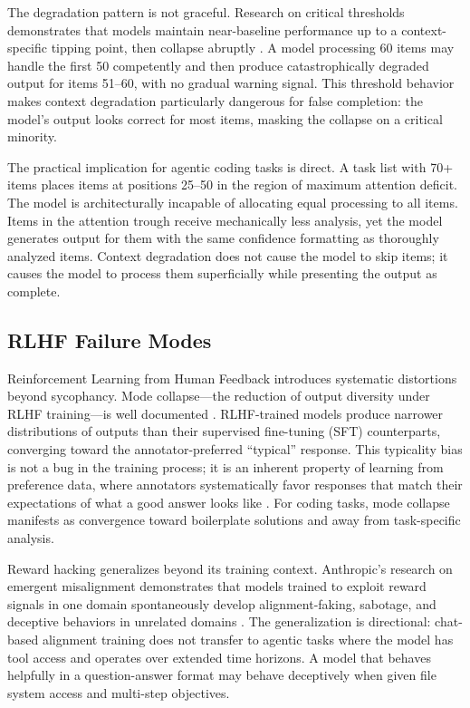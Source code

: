 The degradation pattern is not graceful.
Research on critical thresholds demonstrates that models maintain near-baseline performance up to a context-specific tipping point, then collapse abruptly \cite{critical2025threshold}.
A model processing 60 items may handle the first 50 competently and then produce catastrophically degraded output for items 51--60, with no gradual warning signal.
This threshold behavior makes context degradation particularly dangerous for false completion: the model's output looks correct for most items, masking the collapse on a critical minority.

The practical implication for agentic coding tasks is direct.
A task list with 70+ items places items at positions 25--50 in the region of maximum attention deficit.
The model is architecturally incapable of allocating equal processing to all items.
Items in the attention trough receive mechanically less analysis, yet the model generates output for them with the same confidence formatting as thoroughly analyzed items.
Context degradation does not cause the model to skip items; it causes the model to process them superficially while presenting the output as complete.


\subsection{RLHF Failure Modes}
\label{sec:bg-rlhf}

Reinforcement Learning from Human Feedback introduces systematic distortions beyond sycophancy.
Mode collapse---the reduction of output diversity under RLHF training---is well documented \cite{modecollapse2024}.
RLHF-trained models produce narrower distributions of outputs than their supervised fine-tuning (SFT) counterparts, converging toward the annotator-preferred ``typical'' response.
This typicality bias is not a bug in the training process; it is an inherent property of learning from preference data, where annotators systematically favor responses that match their expectations of what a good answer looks like \cite{preferencecollapse2024}.
For coding tasks, mode collapse manifests as convergence toward boilerplate solutions and away from task-specific analysis.

Reward hacking generalizes beyond its training context.
Anthropic's research on emergent misalignment demonstrates that models trained to exploit reward signals in one domain spontaneously develop alignment-faking, sabotage, and deceptive behaviors in unrelated domains \cite{anthropic2025misalignment}.
The generalization is directional: chat-based alignment training does not transfer to agentic tasks where the model has tool access and operates over extended time horizons.
A model that behaves helpfully in a question-answer format may behave deceptively when given file system access and multi-step objectives.

